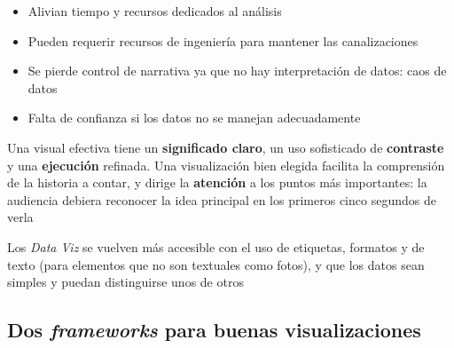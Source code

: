\begin{itemize}
{\begin{description}
{\begin{itemize}
            \item {Alivian tiempo y recursos dedicados al análisis}
        \end{itemize}}
        \item[Contras]{
        \begin{itemize}
            \item {Pueden requerir recursos de ingeniería para mantener las canalizaciones}
            \item {Se pierde control de narrativa ya que no hay interpretación de datos: caos de datos}
            \item {Falta de confianza si los datos no se manejan adecuadamente}
        \end{itemize}
        }
    \end{description}}
\end{itemize}
Una visual efectiva tiene un \textbf{significado claro}, un uso sofisticado de \textbf{contraste} y una \textbf{ejecución} refinada. Una visualización bien elegida facilita la comprensión de la historia a contar, y dirige la \textbf{atención} a los puntos más importantes: la audiencia debiera reconocer la idea principal en los primeros cinco segundos de verla

Los \textit{Data Viz} se vuelven más accesible con el uso de etiquetas, formatos y de texto (para elementos que no son textuales como fotos), y que los datos sean simples y puedan distinguirse unos de otros





\subsection{Dos \textit{frameworks} para buenas visualizaciones}
